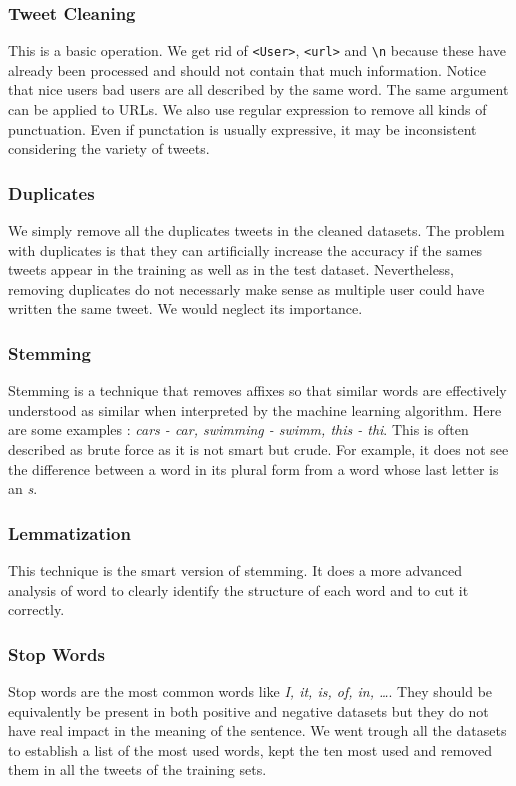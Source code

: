 \documentclass[11pt, a4paper, twocolumn]{article}
\begin{document}
\subsubsection{Tweet Cleaning}
This is a basic operation. We get rid of \texttt{<User>}, \texttt{<url>} and \verb"\n" because these have already been processed and should not contain that much information. Notice that nice users bad users are all described by the same word. The same argument can be applied to URLs. We also use regular expression to remove all kinds of punctuation. Even if punctation is usually expressive, it may be inconsistent considering the variety of tweets.

\subsubsection{Duplicates}
We simply remove all the duplicates tweets in the cleaned datasets. The problem with duplicates is that they can artificially increase the accuracy if the sames tweets appear in the training as well as in the test dataset. Nevertheless, removing duplicates do not necessarly make sense as multiple user could have written the same tweet. We would neglect its importance.

\subsubsection{Stemming}
Stemming is a technique that removes affixes so that similar words are effectively understood as similar when interpreted by the machine learning algorithm. Here are some examples : \textit{cars - car, swimming - swimm, this - thi}. This is often described as brute force as it is not smart but crude. For example, it does not see the difference between a word in its plural form from a word whose last letter is an \textit{s}.

\subsubsection{Lemmatization}
This technique is the smart version of stemming. It does a more advanced analysis of word to clearly identify the structure of each word and to cut it correctly.

\subsubsection{Stop Words}
Stop words are the most common words like \textit{I, it, is, of, in, \dots}. They should be equivalently be present in both positive and negative datasets but they do not have real impact in the meaning of the sentence. We went trough all the datasets to establish a list of the most used words, kept the ten most used and removed them in all the tweets of the training sets.
\end{document}
